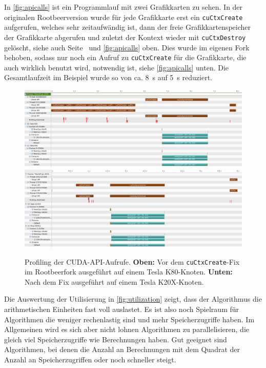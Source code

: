 In \autoref{fig:apicalls} ist ein Programmlauf mit zwei Grafikkarten zu sehen.
In der originalen Rootbeerversion wurde für jede Grafikkarte erst ein \lstinline!cuCtxCreate! aufgerufen, welches sehr zeitaufwändig ist, dann der freie Grafikkartenspeicher der Grafikkarte abgerufen und zuletzt der Kontext wieder mit \lstinline!cuCtxDestroy! gelöscht, siehe auch Seite~\pageref{pg:cuCtxCreate} und \autoref{fig:apicalls} oben.
Dies wurde im eigenen Fork behoben, sodass nur noch ein Aufruf zu \lstinline!cuCtxCreate! für die Grafikkarte, die auch wirklich benutzt wird, notwendig ist, siehe \autoref{fig:apicalls} unten.
Die Gesamtlaufzeit im Beispiel wurde so von ca. \SI{8}{\second} auf \SI{5}{\second} reduziert.

\begin{figure}
	\begin{center}
		\includegraphics[width=\linewidth]{../MontePi/profiling/2of4-APICalls.png}\\
		\includegraphics[width=\linewidth]{../MontePi/profiling/2of2-afterLoadDevicesPerformanceFix.png}
	\end{center}
	\caption{Profiling der CUDA-API-Aufrufe. \textbf{Oben:} Vor dem \lstinline!cuCtxCreate!-Fix im Rootbeerfork ausgeführt auf einem Tesla K80-Knoten. \textbf{Unten:} Nach dem Fix ausgeführt auf einem Tesla K20X-Knoten.}
	\label{fig:apicalls}
\end{figure}

Die Auswertung der Utilisierung in \autoref{fig:utilization} zeigt, dass der Algorithmus die arithmetischen Einheiten fast voll auslastet.
Es ist also noch Spielraum für Algorithmen die weniger rechenlastig sind und mehr Speicherzugriffe haben.
Im Allgemeinen wird es sich aber nicht lohnen Algorithmen zu parallelisieren, die gleich viel Speicherzugriffe wie Berechnungen haben.
Gut geeignet sind Algorithmen, bei denen die Anzahl an Berechnungen mit dem Quadrat der Anzahl an Speicherzugriffen oder noch schneller steigt.

